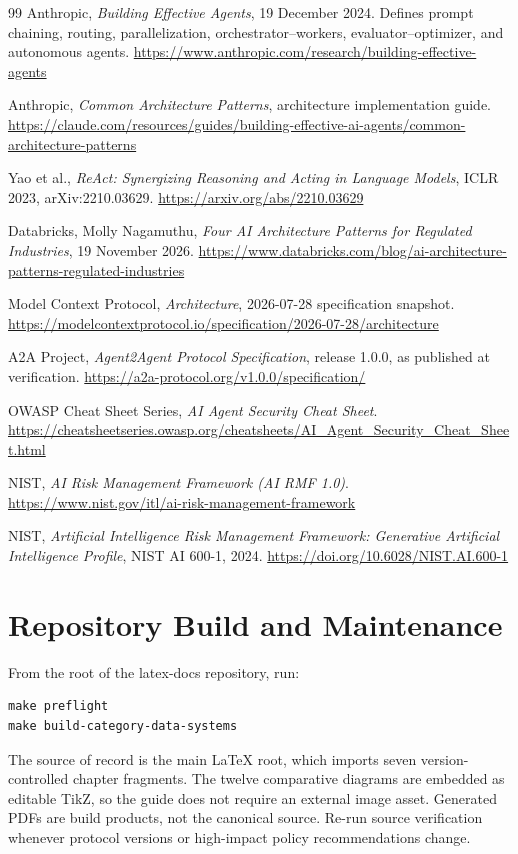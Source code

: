 \begin{thebibliography}{99}\small
{} Anthropic, \emph{Building Effective Agents}, 19 December 2024. Defines prompt chaining, routing, parallelization, orchestrator--workers, evaluator--optimizer, and autonomous agents.
\url{https://www.anthropic.com/research/building-effective-agents}

 Anthropic, \emph{Common Architecture Patterns}, architecture implementation guide.
\url{https://claude.com/resources/guides/building-effective-ai-agents/common-architecture-patterns}

 Yao et al., \emph{ReAct: Synergizing Reasoning and Acting in Language Models}, ICLR 2023, arXiv:2210.03629.
\url{https://arxiv.org/abs/2210.03629}

 Databricks, Molly Nagamuthu, \emph{Four AI Architecture Patterns for Regulated Industries}, 19 November 2026.
\url{https://www.databricks.com/blog/ai-architecture-patterns-regulated-industries}

 Model Context Protocol, \emph{Architecture}, 2026-07-28 specification snapshot.
\url{https://modelcontextprotocol.io/specification/2026-07-28/architecture}

 A2A Project, \emph{Agent2Agent Protocol Specification}, release 1.0.0, as published at verification.
\url{https://a2a-protocol.org/v1.0.0/specification/}

 OWASP Cheat Sheet Series, \emph{AI Agent Security Cheat Sheet}.
\url{https://cheatsheetseries.owasp.org/cheatsheets/AI_Agent_Security_Cheat_Sheet.html}

 NIST, \emph{AI Risk Management Framework (AI RMF 1.0)}.
\url{https://www.nist.gov/itl/ai-risk-management-framework}

 NIST, \emph{Artificial Intelligence Risk Management Framework: Generative Artificial Intelligence Profile}, NIST AI 600-1, 2024.
\url{https://doi.org/10.6028/NIST.AI.600-1}
\end{thebibliography}

\section{Repository Build and Maintenance}
From the root of the latex-docs repository, run:
\begin{verbatim}
make preflight
make build-category-data-systems
\end{verbatim}
The source of record is the main LaTeX root, which imports seven version-controlled chapter fragments. The twelve comparative diagrams are embedded as editable TikZ, so the guide does not require an external image asset. Generated PDFs are build products, not the canonical source. Re-run source verification whenever protocol versions or high-impact policy recommendations change.
